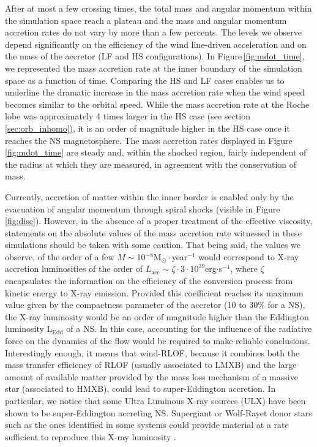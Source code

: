 \documentclass{aa}
\makeatletter
\newcommand*{\ns}{NS\@\xspace}
\makeatother
\begin{document}
After at most a few crossing times, the total mass and angular momentum within the simulation space reach a plateau and the mass and angular momentum accretion rates do not vary by more than a few percents. The levels we observe depend significantly on the efficiency of the wind line-driven acceleration and on the mass of the accretor (LF and HS configurations). In Figure\,\ref{fig:mdot_time}, we represented the mass accretion rate at the inner boundary of the simulation space as a function of time. Comparing the HS and LF cases enables us to underline the dramatic increase in the mass accretion rate when the wind speed becomes similar to the orbital speed. While the mass accretion rate at the Roche lobe was approximately 4 times larger in the HS case (see section\,\ref{sec:orb_inhomo}), it is an order of magnitude higher in the HS case once it reaches the \ns magnetosphere. The mass accretion rates displayed in Figure\,\ref{fig:mdot_time} are steady and, within the shocked region, fairly independent of the radius at which they are measured, in agreement with the conservation of mass.

Currently, accretion of matter within the inner border is enabled only by the evacuation of angular momentum through spiral shocks (visible in Figure\,\ref{fig:disc}). However, in the absence of a proper treatment of the effective viscosity, statements on the absolute values of the mass accretion rate witnessed in these simulations should be taken with some caution. That being said, the values we observe, of the order of a few $\dot{M}\sim$10$^{-8}$M$_{\odot}\cdot$year$^{-1}$ would correspond to X-ray accretion luminosities of the order of $L_{\text{acc}}\sim\zeta\cdot3\cdot10^{39}$erg$\cdot$s$^{-1}$, where $\zeta$ encapsulates the information on the efficiency of the conversion process from kinetic energy to X-ray emission. Provided this coefficient reaches its maximum value given by the compactness parameter of the accretor (10 to 30\% for a \ns), the X-ray luminosity would be an order of magnitude higher than the Eddington luminosity L$_{\text{Edd}}$ of a \ns. In this case, accounting for the influence of the radiative force on the dynamics of the flow would be required to make reliable conclusions. Interestingly enough, it means that wind-RLOF, because it combines both the mass transfer efficiency of RLOF (usually associated to LMXB) and the large amount of available matter provided by the mass loss mechanism of a massive star (associated to HMXB), could lead to super-Eddington accretion. In particular, we notice that some Ultra Luminous X-ray sources (ULX) have been shown to be super-Eddington accreting \ns \citep{Bachetti2014,Furst2016,Israel2017}. Supergiant or Wolf-Rayet donor stars such as the ones identified in some systems could provide material at a rate sufficient to reproduce this X-ray luminosity \citep[][submitted]{ElMellah2018a}. 
\end{document}

